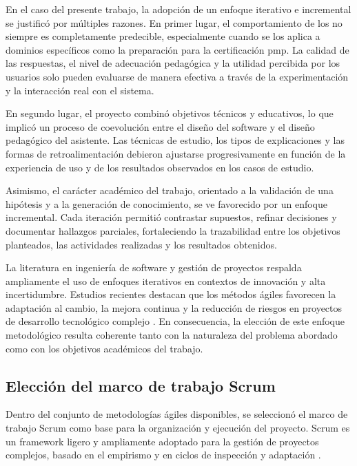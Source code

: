 En el caso del presente trabajo, la adopción de un enfoque iterativo e incremental se justificó por múltiples razones. En primer lugar, el comportamiento de los  no siempre es completamente predecible, especialmente cuando se los aplica a dominios específicos como la preparación para la certificación \gls{pmp}. La calidad de las respuestas, el nivel de adecuación pedagógica y la utilidad percibida por los usuarios solo pueden evaluarse de manera efectiva a través de la experimentación y la interacción real con el sistema.

En segundo lugar, el proyecto combinó objetivos técnicos y educativos, lo que implicó un proceso de coevolución entre el diseño del software y el diseño pedagógico del asistente. Las técnicas de estudio, los tipos de explicaciones y las formas de retroalimentación debieron ajustarse progresivamente en función de la experiencia de uso y de los resultados observados en los casos de estudio.

Asimismo, el carácter académico del trabajo, orientado a la validación de una hipótesis y a la generación de conocimiento, se ve favorecido por un enfoque incremental. Cada iteración permitió contrastar supuestos, refinar decisiones y documentar hallazgos parciales, fortaleciendo la trazabilidad entre los objetivos planteados, las actividades realizadas y los resultados obtenidos.

La literatura en ingeniería de software y gestión de proyectos respalda ampliamente el uso de enfoques iterativos en contextos de innovación y alta incertidumbre. Estudios recientes destacan que los métodos ágiles favorecen la adaptación al cambio, la mejora continua y la reducción de riesgos en proyectos de desarrollo tecnológico complejo \parencite{rath2025agile, dong2024agile}. En consecuencia, la elección de este enfoque metodológico resulta coherente tanto con la naturaleza del problema abordado como con los objetivos académicos del trabajo.

\subsection{Elección del marco de trabajo Scrum}

Dentro del conjunto de metodologías ágiles disponibles, se seleccionó el marco de trabajo Scrum como base para la organización y ejecución del proyecto. Scrum es un framework ligero y ampliamente adoptado para la gestión de proyectos complejos, basado en el empirismo y en ciclos de inspección y adaptación \parencite{verwijs2023scrum}.

